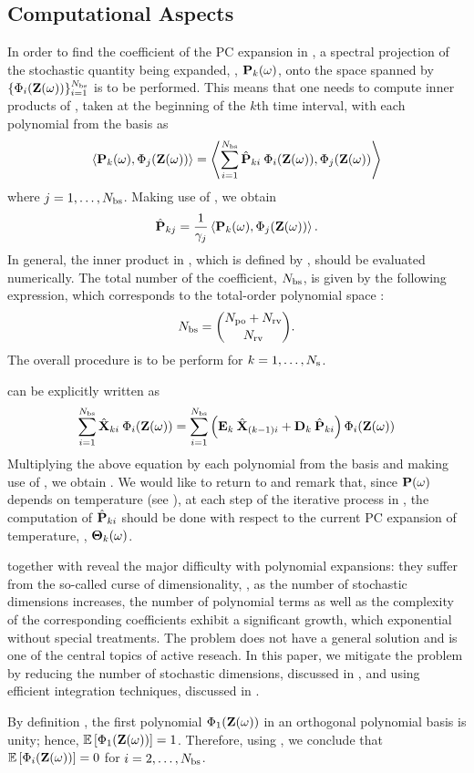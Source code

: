 \subsection{Computational Aspects} 
In order to find the coefficient of the PC expansion in , a spectral projection of the stochastic quantity being expanded, \ie, $\mathbf{P}_k(\omega)$, onto the space spanned by $\{ \Phi_i(\mathbf{Z}(\omega)) \}_{i = 1}^{{N_\text{bs}}}$ is to be performed. This means that one needs to compute inner products of , taken at the beginning of the $k$th time interval, with each polynomial from the basis as
\[
  \oInner{\vP_k(\o)}{\pcb_j(\vZ(\o))} = \oInner{\sum_{i=1}^{\pcterms} \pcc{\vP}_{ki} \: \pcb_i(\vZ(\o))}{\pcb_j(\vZ(\o))}
\]
where $j = 1, \dotsc, {N_\text{bs}}$. Making use of , we obtain
\begin{equation} \elabel{pc-coefficients}
  \pcc{\vP}_{kj} = \frac{1}{\pcn_j} \oInner{\vP_k(\o)}{\pcb_j(\vZ(\o))}.
\end{equation}
In general, the inner product in , which is defined by , should be evaluated numerically. The total number of the coefficient, ${N_\text{bs}}$, is given by the following expression, which corresponds to the total-order polynomial space \cite{beck2011}:
\begin{equation} \elabel{pc-terms}
  \pcterms = { \pcorder + \vars \choose \vars }.
\end{equation}
The overall procedure is to be perform for $k = 1, \dotsc, N_\text{s}$.

 can be explicitly written as
\[
  \sum_{i = 1}^{\pcterms} \pcc{\vX}_{ki} \: \pcb_i(\vZ(\o)) = \sum_{i = 1}^{\pcterms} \left( \mE_k \: \pcc{\vX}_{(k - 1)i} + \mD_k \: \pcc{\vP}_{ki} \right) \pcb_i(\vZ(\o))
\]
Multiplying the above equation by each polynomial from the basis and making use of , we obtain . We would like to return to  and remark that, since $\mathbf{P}(\omega)$ depends on temperature (see ), at each step of the iterative process in , the computation of $\hat{\mathbf{P}}_{ki}$ should be done with respect to the current PC expansion of temperature, \ie, ${\boldsymbol\Theta}_k(\omega)$.

 together with  reveal the major difficulty with polynomial expansions: they suffer from the so-called curse of dimensionality, \ie, as the number of stochastic dimensions increases, the number of polynomial terms as well as the complexity of the corresponding coefficients exhibit a significant growth, which exponential without special treatments. The problem does not have a general solution and is one of the central topics of active reseach. In this paper, we mitigate the problem by reducing the number of stochastic dimensions, discussed in , and using efficient integration techniques, discussed in .

By definition \cite{xiu2010}, the first polynomial $\Phi_1(\mathbf{Z}(\omega))$ in an orthogonal polynomial basis is unity; hence, $\mathbb{E}\left[\Phi_1(\mathbf{Z}(\omega))\right] = 1$. Therefore, using , we conclude that $\mathbb{E}\left[\Phi_i(\mathbf{Z}(\omega))\right] = 0$ for $i = 2, \dotsc, {N_\text{bs}}$.

